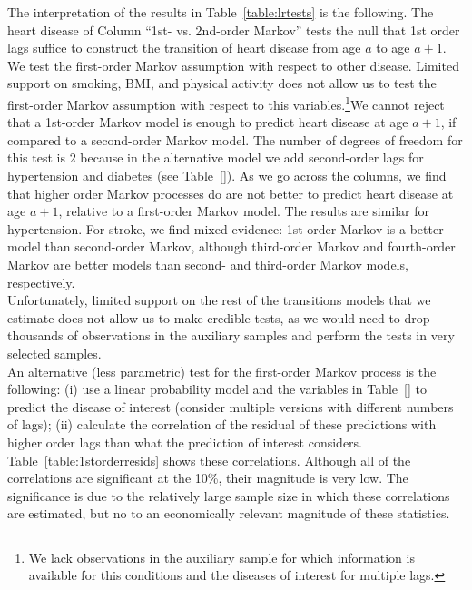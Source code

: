 \documentclass{article}
\begin{document}
\noindent The interpretation of the results in Table~\ref{table:lrtests} is the following. The heart disease of Column ``1st- vs. 2nd-order Markov'' tests the null that 1st order lags suffice to construct the transition of heart disease from age $a$ to age $a+1$. We test the first-order Markov assumption with respect to other disease. Limited support on smoking, BMI, and physical activity does not allow us to test the first-order Markov assumption with respect to this variables.\footnote{We lack observations in the auxiliary sample for which information is available for this conditions and the diseases of interest for multiple lags.}We cannot reject that a 1st-order Markov model is enough to predict heart disease at age $a+1$, if compared to a second-order Markov model. The number of degrees of freedom for this test is $2$ because in the alternative model we add second-order lags for hypertension and diabetes (see Table~\ref{}). As we go across the columns, we find that higher order Markov processes do are not better to predict heart disease at age $a+1$, relative to a first-order Markov model. The results are similar for hypertension. For stroke, we find mixed evidence: 1st order Markov is a better model than second-order Markov, although third-order Markov and fourth-order Markov are better models than second- and third-order Markov models, respectively.\\ 

\noindent Unfortunately, limited support on the rest of the transitions models that we estimate does not allow us to make credible tests, as we would need to drop thousands of observations in the auxiliary samples and perform the tests in very selected samples.\\

\noindent An alternative (less parametric) test for the first-order Markov process is the following: (i) use a linear probability model and the variables in Table~\ref{} to predict the disease of interest (consider multiple versions with different numbers of lags); (ii) calculate the correlation of the residual of these predictions with higher order lags than what the prediction of interest considers. Table~\ref{table:1storderresids} shows these correlations. Although all of the correlations are significant at the 10\%, their magnitude is very low. The significance is due to the relatively large sample size in which these correlations are estimated, but no to an economically relevant magnitude of these statistics. 
\end{document}
